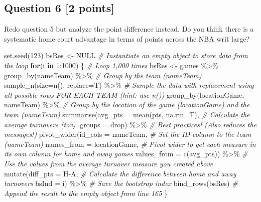 \documentclass[
]{article}
\newenvironment{Shaded}{\begin{snugshade}}{\end{snugshade}}
\newcommand{\AttributeTok}[1]{\textcolor[rgb]{0.77,0.63,0.00}{#1}}
\newcommand{\CommentTok}[1]{\textcolor[rgb]{0.56,0.35,0.01}{\textit{#1}}}
\newcommand{\ConstantTok}[1]{\textcolor[rgb]{0.00,0.00,0.00}{#1}}
\newcommand{\ControlFlowTok}[1]{\textcolor[rgb]{0.13,0.29,0.53}{\textbf{#1}}}
\newcommand{\DecValTok}[1]{\textcolor[rgb]{0.00,0.00,0.81}{#1}}
\newcommand{\FunctionTok}[1]{\textcolor[rgb]{0.00,0.00,0.00}{#1}}
\newcommand{\NormalTok}[1]{#1}
\newcommand{\OtherTok}[1]{\textcolor[rgb]{0.56,0.35,0.01}{#1}}
\newcommand{\SpecialCharTok}[1]{\textcolor[rgb]{0.00,0.00,0.00}{#1}}
\newcommand{\StringTok}[1]{\textcolor[rgb]{0.31,0.60,0.02}{#1}}
\begin{document}
\hypertarget{question-6-2-points}{%
\subsection{Question 6 {[}2 points{]}}\label{question-6-2-points}}

Redo question 5 but analyze the point difference instead. Do you think
there is a systematic home court advantage in terms of points across the
NBA writ large?

\begin{Shaded}
\begin{Highlighting}[]
\FunctionTok{set.seed}\NormalTok{(}\DecValTok{123}\NormalTok{)}
\NormalTok{bsRes }\OtherTok{\textless{}{-}} \ConstantTok{NULL} \CommentTok{\# Instantiate an empty object to store data from the loop}
\ControlFlowTok{for}\NormalTok{(i }\ControlFlowTok{in} \DecValTok{1}\SpecialCharTok{:}\DecValTok{1000}\NormalTok{) \{ }\CommentTok{\# Loop 1,000 times}
\NormalTok{  bsRes }\OtherTok{\textless{}{-}}\NormalTok{ games }\SpecialCharTok{\%\textgreater{}\%}
    \FunctionTok{group\_by}\NormalTok{(nameTeam) }\SpecialCharTok{\%\textgreater{}\%} \CommentTok{\# Group by the team (nameTeam)}
    \FunctionTok{sample\_n}\NormalTok{(}\AttributeTok{size=}\FunctionTok{n}\NormalTok{(), }\AttributeTok{replace=}\NormalTok{T) }\SpecialCharTok{\%\textgreater{}\%} \CommentTok{\# Sample the data with replacement using all possible rows FOR EACH TEAM (hint: use n())}
    \FunctionTok{group\_by}\NormalTok{(locationGame, nameTeam) }\SpecialCharTok{\%\textgreater{}\%} \CommentTok{\# Group by the location of the game (locationGame) and the team (nameTeam)}
    \FunctionTok{summarise}\NormalTok{(}\AttributeTok{avg\_pts =} \FunctionTok{mean}\NormalTok{(pts, }\AttributeTok{na.rm=}\NormalTok{T), }\CommentTok{\# Calculate the average turnovers (tov)}
              \AttributeTok{.groups =} \StringTok{\textquotesingle{}drop\textquotesingle{}}\NormalTok{) }\SpecialCharTok{\%\textgreater{}\%} \CommentTok{\# Best practices! (Also reduces the messages!)}
    \FunctionTok{pivot\_wider}\NormalTok{(}\AttributeTok{id\_cols =}\NormalTok{ nameTeam, }\CommentTok{\# Set the ID colunm to the team (nameTeam)}
                \AttributeTok{names\_from =}\NormalTok{ locationGame, }\CommentTok{\# Pivot wider to get each measure in its own column for home and away games}
                \AttributeTok{values\_from =} \FunctionTok{c}\NormalTok{(}\StringTok{\textquotesingle{}avg\_pts\textquotesingle{}}\NormalTok{)) }\SpecialCharTok{\%\textgreater{}\%} \CommentTok{\# Use the values from the average turnover measure you created above}
    \FunctionTok{mutate}\NormalTok{(}\AttributeTok{diff\_pts =}\NormalTok{ H}\SpecialCharTok{{-}}\NormalTok{A, }\CommentTok{\# Calculate the difference between home and away turnovers}
           \AttributeTok{bsInd =}\NormalTok{ i) }\SpecialCharTok{\%\textgreater{}\%} \CommentTok{\# Save the bootstrap index}
    \FunctionTok{bind\_rows}\NormalTok{(bsRes) }\CommentTok{\# Append the result to the empty object from line 165}
\NormalTok{\} }


\end{Highlighting}
\end{Shaded}
\end{document}
